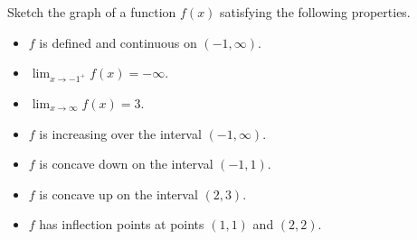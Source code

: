\documentclass[../main.tex]{subfiles}
\begin{document}
\begin{example}
  Sketch the graph of a function \(f(x)\) satisfying the following properties.
  \begin{itemize}
    \item \(f\) is defined and continuous on \((-1, \infty)\).
    \item \(\lim_{x \to -1^{+}} f(x) = -\infty\).
    \item \(\lim_{x \to \infty} f(x) = 3\).
    \item \(f\) is increasing over the interval \((-1,\infty)\).
    \item \(f\) is concave down on the interval \((-1,1)\).
    \item \(f\) is concave up on the interval \((2, 3)\).
    \item \(f\) has inflection points at points \((1,1)\) and \((2,2)\).
  \end{itemize}

\end{example}
\end{document}
